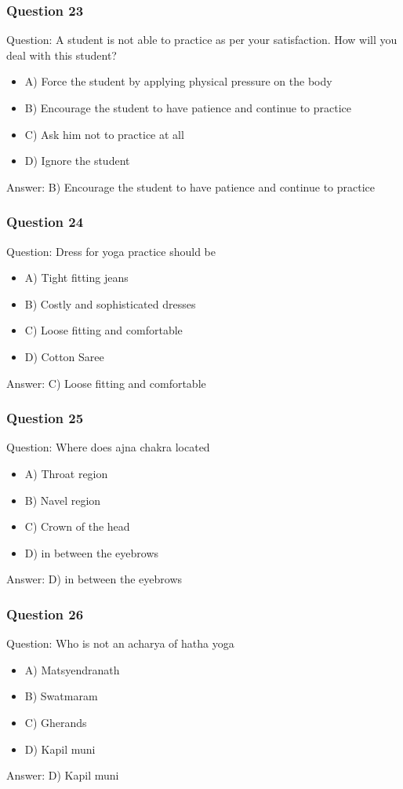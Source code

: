 \begin{frame}[fragile]\frametitle{Question 23}
Question: A student is not able to practice as per your satisfaction. How will you deal with this student?
\begin{itemize}
\item A) Force the student by applying physical pressure on the body
\item B) Encourage the student to have patience and continue to practice
\item C) Ask him not to practice at all
\item D) Ignore the student
\end{itemize}
Answer: B) Encourage the student to have patience and continue to practice
\end{frame}

\begin{frame}[fragile]\frametitle{Question 24}
Question: Dress for yoga practice should be
\begin{itemize}
\item A) Tight fitting jeans
\item B) Costly and sophisticated dresses
\item C) Loose fitting and comfortable
\item D) Cotton Saree
\end{itemize}
Answer: C) Loose fitting and comfortable
\end{frame}

\begin{frame}[fragile]\frametitle{Question 25}
Question: Where does ajna chakra located
\begin{itemize}
\item A) Throat region
\item B) Navel region
\item C) Crown of the head
\item D) in between the eyebrows
\end{itemize}
Answer: D) in between the eyebrows
\end{frame}

\begin{frame}[fragile]\frametitle{Question 26}
Question: Who is not an acharya of hatha yoga
\begin{itemize}
\item A) Matsyendranath
\item B) Swatmaram
\item C) Gherands
\item D) Kapil muni
\end{itemize}
Answer: D) Kapil muni
\end{frame}

